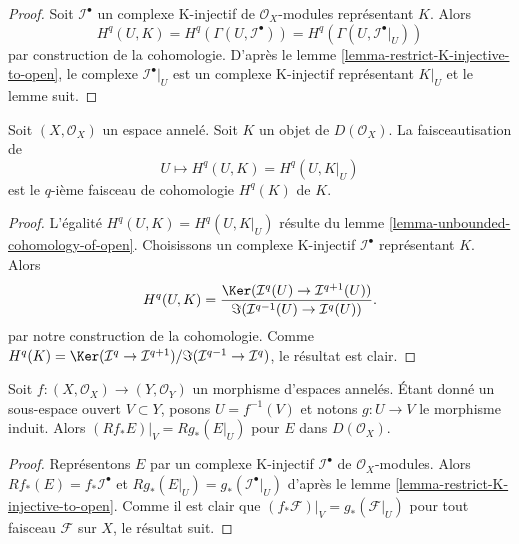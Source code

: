 {\begin{proof}

Soit $\mathcal{I}^\bullet$ un complexe K-injectif de $\mathcal{O}_X$-modules représentant $K$. Alors
$$
H^q(U, K) = H^q(\Gamma(U, \mathcal{I}^\bullet)) =
H^q(\Gamma(U, \mathcal{I}^\bullet|_U))
$$
par construction de la cohomologie. D'après le lemme \ref{lemma-restrict-K-injective-to-open},
le complexe $\mathcal{I}^\bullet|_U$ est un complexe K-injectif représentant $K|_U$ et le lemme suit.

\end{proof}

\begin{lemma}

\label{lemma-sheafification-cohomology}
Soit $(X, \mathcal{O}_X)$ un espace annelé. Soit $K$ un objet de $D(\mathcal{O}_X)$. La faisceautisation de $$
U \mapsto H^q(U, K) = H^q(U, K|_U)
$$ est le $q$-ième faisceau de cohomologie $H^q(K)$ de $K$.
\end{lemma}

\begin{proof}

L'égalité $H^q(U, K) = H^q(U, K|_U)$ résulte du lemme \ref{lemma-unbounded-cohomology-of-open}. Choisissons un complexe K-injectif $\mathcal{I}^\bullet$ représentant $K$. Alors
$$
H^q(U, K) =
\frac{\Ker(\mathcal{I}^q(U) \to \mathcal{I}^{q + 1}(U))}
{\Im(\mathcal{I}^{q - 1}(U) \to \mathcal{I}^q(U))}.
$$
par notre construction de la cohomologie. Comme
$H^q(K) = \Ker(\mathcal{I}^q \to \mathcal{I}^{q + 1})/
\Im(\mathcal{I}^{q - 1} \to \mathcal{I}^q)$, le résultat est clair.

\end{proof}

\begin{lemma}

\label{lemma-restrict-direct-image-open}
Soit $f : (X, \mathcal{O}_X) \to (Y, \mathcal{O}_Y)$ un morphisme d'espaces annelés. Étant donné un sous-espace ouvert $V \subset Y$, posons $U = f^{-1}(V)$ et notons $g : U \to V$ le morphisme induit. Alors $(Rf_*E)|_V = Rg_*(E|_U)$ pour $E$ dans $D(\mathcal{O}_X)$.
\end{lemma}

\begin{proof}
Représentons $E$ par un complexe K-injectif $\mathcal{I}^\bullet$ de $\mathcal{O}_X$-modules. Alors $Rf_*(E) = f_*\mathcal{I}^\bullet$ et $Rg_*(E|_U) = g_*(\mathcal{I}^\bullet|_U)$ d'après le lemme \ref{lemma-restrict-K-injective-to-open}. Comme il est clair que $(f_*\mathcal{F})|_V = g_*(\mathcal{F}|_U)$ pour tout faisceau $\mathcal{F}$ sur $X$, le résultat suit.
\end{proof}

}
